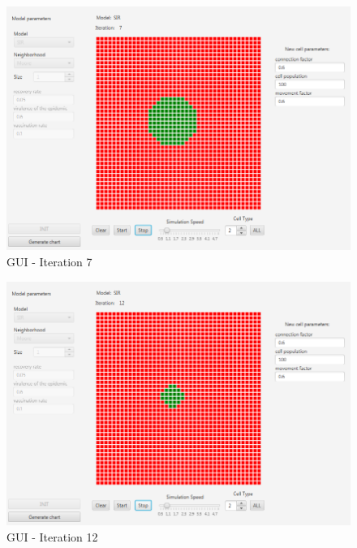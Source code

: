 \documentclass[a4paper, 11pt]{article}
\begin{document}
\begin{figure}[H]
\includegraphics[width=\textwidth]{i7.PNG} 
\caption{GUI - Iteration 7}
\end{figure}
\begin{figure}[H]
\includegraphics[width=\textwidth]{i12.PNG} 
\caption{GUI - Iteration 12}
\end{figure}
\fi
\end{document}
